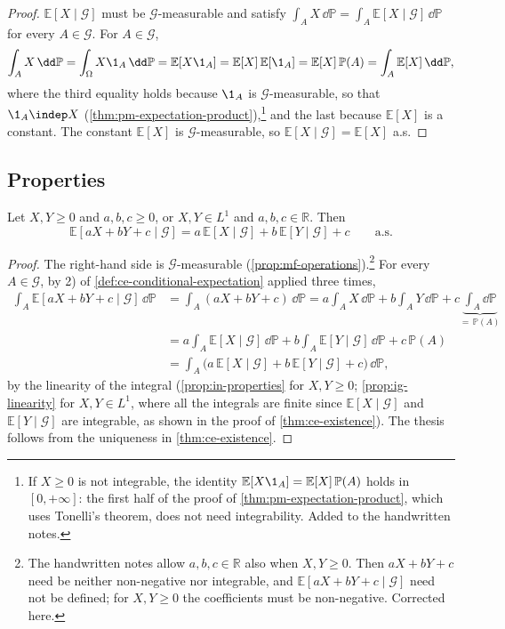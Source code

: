\begin{proof}
$\mathbb E[X\mid\mathcal G]$ must be $\mathcal G$-measurable and satisfy
$\int_AX\,\dd\mathbb P=\int_A\mathbb E[X\mid\mathcal G]\,\dd\mathbb P$ for every $A\in\mathcal G$.
For $A\in\mathcal G$,
\[
  \int_AX\,\dd\mathbb P=\int_\Omega X\1_A\,\dd\mathbb P=\mathbb E[X\1_A]
  =\mathbb E[X]\,\mathbb E[\1_A]=\mathbb E[X]\,\mathbb P(A)=\int_A\mathbb E[X]\,\dd\mathbb P,
\]
where the third equality holds because $\1_A$ is $\mathcal G$-measurable, so that $\1_A\indep X$
(\cref{thm:pm-expectation-product}),\footnote{If $X\ge0$ is not integrable, the identity
$\mathbb E[X\1_A]=\mathbb E[X]\,\mathbb P(A)$ holds in $[0,+\infty]$: the first half of the proof of
\cref{thm:pm-expectation-product}, which uses Tonelli's theorem, does not need integrability.
Added to the handwritten notes.} and the last because $\mathbb E[X]$ is a constant. The constant
$\mathbb E[X]$ is $\mathcal G$-measurable, so $\mathbb E[X\mid\mathcal G]=\mathbb E[X]$ a.s.
\end{proof}

\subsection{Properties}\label{sec:cp-list}

\begin{proposition}\label{prop:cp-linearity}
Let $X,Y\ge0$ and $a,b,c\ge0$, or $X,Y\in L^1$ and $a,b,c\in\mathbb R$. Then
\[
  \mathbb E[aX+bY+c\mid\mathcal G]=a\,\mathbb E[X\mid\mathcal G]+b\,\mathbb E[Y\mid\mathcal G]+c
  \qquad\text{a.s.}
\]
\end{proposition}

\begin{proof}
The right-hand side is $\mathcal G$-measurable (\cref{prop:mf-operations}).\footnote{The
handwritten notes allow $a,b,c\in\mathbb R$ also when $X,Y\ge0$. Then $aX+bY+c$ need be neither
non-negative nor integrable, and $\mathbb E[aX+bY+c\mid\mathcal G]$ need not be defined; for
$X,Y\ge0$ the coefficients must be non-negative. Corrected here.} For every $A\in\mathcal G$, by
2) of \cref{def:ce-conditional-expectation} applied three times,
\[
\begin{aligned}
  \int_A\mathbb E[aX+bY+c\mid\mathcal G]\,\dd\mathbb P&=\int_A(aX+bY+c)\,\dd\mathbb P
  =a\int_AX\,\dd\mathbb P+b\int_AY\,\dd\mathbb P+c\underbrace{\int_A\dd\mathbb P}_{=\,\mathbb P(A)}\\
  &=a\int_A\mathbb E[X\mid\mathcal G]\,\dd\mathbb P+b\int_A\mathbb E[Y\mid\mathcal G]\,\dd\mathbb P+c\,\mathbb P(A)\\
  &=\int_A\big(a\,\mathbb E[X\mid\mathcal G]+b\,\mathbb E[Y\mid\mathcal G]+c\big)\,\dd\mathbb P,
\end{aligned}
\]
by the linearity of the integral (\cref{prop:in-properties} for $X,Y\ge0$; \cref{prop:ig-linearity}
for $X,Y\in L^1$, where all the integrals are finite since $\mathbb E[X\mid\mathcal G]$ and
$\mathbb E[Y\mid\mathcal G]$ are integrable, as shown in the proof of \cref{thm:ce-existence}).
The thesis follows from the uniqueness in \cref{thm:ce-existence}.
\end{proof}

